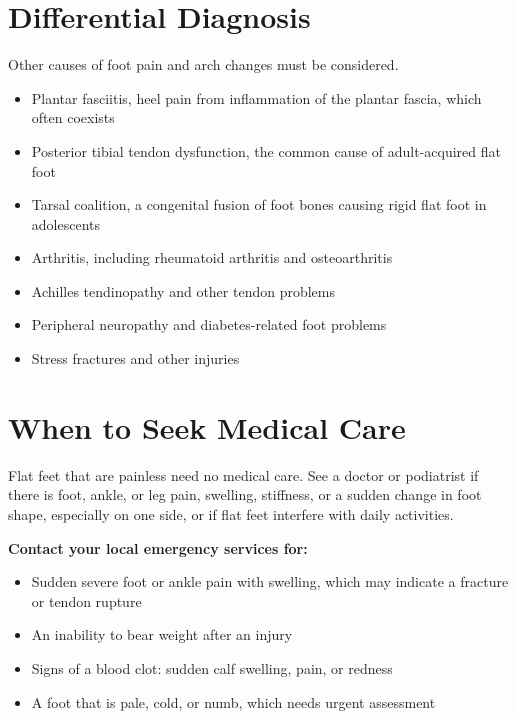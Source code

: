 \section*{Differential Diagnosis}
Other causes of foot pain and arch changes must be considered.
\begin{itemize}
    \item Plantar fasciitis, heel pain from inflammation of the plantar fascia, which often coexists
    \item Posterior tibial tendon dysfunction, the common cause of adult-acquired flat foot
    \item Tarsal coalition, a congenital fusion of foot bones causing rigid flat foot in adolescents
    \item Arthritis, including rheumatoid arthritis and osteoarthritis
    \item Achilles tendinopathy and other tendon problems
    \item Peripheral neuropathy and diabetes-related foot problems
    \item Stress fractures and other injuries
\end{itemize}

\section*{When to Seek Medical Care}
Flat feet that are painless need no medical care. See a doctor or podiatrist if there is foot, ankle, or leg pain, swelling, stiffness, or a sudden change in foot shape, especially on one side, or if flat feet interfere with daily activities.

\textbf{Contact your local emergency services for:}
\begin{itemize}
    \item Sudden severe foot or ankle pain with swelling, which may indicate a fracture or tendon rupture
    \item An inability to bear weight after an injury
    \item Signs of a blood clot: sudden calf swelling, pain, or redness
    \item A foot that is pale, cold, or numb, which needs urgent assessment
\end{itemize}

